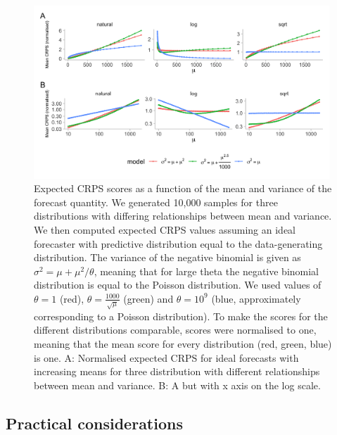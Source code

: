 \documentclass{article}
\begin{document}
\begin{figure}[h!]
    \centering
    \includegraphics[width=0.99\textwidth]{output/figures/SIM-mean-state-size.png}
    \caption{Expected CRPS scores as a function of the mean and variance of the forecast quantity. We generated 10,000 samples for three distributions with differing relationships between mean and variance. We then computed expected CRPS values assuming an ideal forecaster with predictive distribution equal to the data-generating distribution. The variance of the negative binomial is given as $\sigma^2 = \mu + \mu^2 / \theta$, meaning that for large theta the negative binomial distribution is equal to the Poisson distribution. We used values of $\theta = 1$ (red), $\theta = \frac{1000}{\sqrt{\mu}}$ (green) and $\theta = 10^9$ (blue, approximately corresponding to a Poisson distribution). To make the scores for the different distributions comparable, scores were normalised to one, meaning that the mean score for every distribution (red, green, blue) is one. 
    A: Normalised expected CRPS for ideal forecasts with increasing means for three distribution with different relationships between mean and variance. B: A but with x axis on the log scale.}
    \label{fig:SIM-wis-state-size-mean}
\end{figure}

\subsection{Practical considerations}
\label{sec:methods:considerations}
\end{document}
